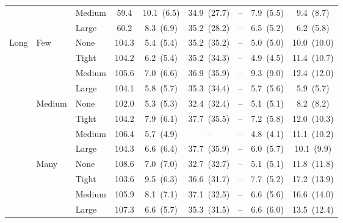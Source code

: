 \begin{table}[htbp]
{\begin{tabular}{lll c ccccc}
 &  & {\small Medium} & 59.4 & 10.1~{\scriptsize(6.5)} & 34.9~{\scriptsize(27.7)} & -- & 7.9~{\scriptsize(5.5)} & 9.4~{\scriptsize(8.7)} \\
 &  & {\small Large} & 60.2 & 8.3~{\scriptsize(6.9)} & 35.2~{\scriptsize(28.2)} & -- & 6.5~{\scriptsize(5.2)} & 6.2~{\scriptsize(5.8)} \\
\midrule
\multirow{12}{*}{\small Long} & \multirow{4}{*}{\small Few} & {\small None} & 104.3 & 5.4~{\scriptsize(5.4)} & 35.2~{\scriptsize(35.2)} & -- & 5.0~{\scriptsize(5.0)} & 10.0~{\scriptsize(10.0)} \\
 &  & {\small Tight} & 104.2 & 6.2~{\scriptsize(5.4)} & 35.2~{\scriptsize(34.3)} & -- & 4.9~{\scriptsize(4.5)} & 11.4~{\scriptsize(10.7)} \\
 &  & {\small Medium} & 105.6 & 7.0~{\scriptsize(6.6)} & 36.9~{\scriptsize(35.9)} & -- & 9.3~{\scriptsize(9.0)} & 12.4~{\scriptsize(12.0)} \\
 &  & {\small Large} & 104.1 & 5.8~{\scriptsize(5.7)} & 35.3~{\scriptsize(34.4)} & -- & 5.7~{\scriptsize(5.6)} & 5.9~{\scriptsize(5.7)} \\
 & \multirow{4}{*}{\small Medium} & {\small None} & 102.0 & 5.3~{\scriptsize(5.3)} & 32.4~{\scriptsize(32.4)} & -- & 5.1~{\scriptsize(5.1)} & 8.2~{\scriptsize(8.2)} \\
 &  & {\small Tight} & 104.2 & 7.9~{\scriptsize(6.1)} & 37.7~{\scriptsize(35.5)} & -- & 7.2~{\scriptsize(5.8)} & 12.0~{\scriptsize(10.3)} \\
 &  & {\small Medium} & 106.4 & 5.7~{\scriptsize(4.9)} & -- & -- & 4.8~{\scriptsize(4.1)} & 11.1~{\scriptsize(10.2)} \\
 &  & {\small Large} & 104.3 & 6.6~{\scriptsize(6.4)} & 37.7~{\scriptsize(35.9)} & -- & 6.0~{\scriptsize(5.7)} & 10.1~{\scriptsize(9.9)} \\
 & \multirow{4}{*}{\small Many} & {\small None} & 108.6 & 7.0~{\scriptsize(7.0)} & 32.7~{\scriptsize(32.7)} & -- & 5.1~{\scriptsize(5.1)} & 11.8~{\scriptsize(11.8)} \\
 &  & {\small Tight} & 103.6 & 9.5~{\scriptsize(6.3)} & 36.6~{\scriptsize(31.7)} & -- & 7.7~{\scriptsize(5.2)} & 17.2~{\scriptsize(13.9)} \\
 &  & {\small Medium} & 105.9 & 8.1~{\scriptsize(7.1)} & 37.1~{\scriptsize(32.5)} & -- & 6.6~{\scriptsize(5.6)} & 16.6~{\scriptsize(14.0)} \\
 &  & {\small Large} & 107.3 & 6.6~{\scriptsize(5.7)} & 35.3~{\scriptsize(31.5)} & -- & 6.6~{\scriptsize(6.0)} & 13.5~{\scriptsize(12.4)} \\
\bottomrule
\end{tabular}%
}
\end{table}


